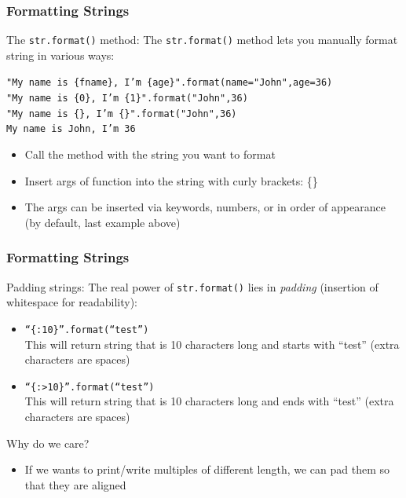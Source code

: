 \documentclass{beamer}
\newcommand{\code}[1]{\texttt{#1}}
\begin{document}
\begin{frame}	
\end{frame}

\begin{frame}	
	\frametitle{Formatting Strings}
	
	\begin{block}{The \code{str.format()} method:}
		The \code{str.format()} method lets you manually format string in various ways:
		
		\vspace{10pt}
		\code{"My name is \{fname\}, I'm \{age\}".format(name="John",age=36)\\
		"My name is \{0\}, I'm \{1\}".format("John",36)\\
		"My name is \{\}, I'm \{\}".format("John",36) \\[10pt]
		My name is John, I'm 36
		}
		
		\vspace{10pt}
		\begin{itemize}
			\item Call the method with the string you want to format
			\item Insert args of function into the string with curly brackets: \{\}
			\item The args can be inserted via keywords, numbers, or in order of appearance (by default, last example above)
		\end{itemize}
	\end{block}
	
\end{frame}

\begin{frame}	
	\frametitle{Formatting Strings}
	
	\begin{block}{Padding strings:}
		The real power of \code{str.format()} lies in \emph{padding} (insertion of whitespace for readability):
		\begin{itemize}
			\item \code{``\{:10\}''.format(``test'')} \\
					This will return string that is 10 characters long and starts with ``test'' (extra characters are spaces)
			\item \code{``\{:$>$10\}''.format(``test'')} \\
					This will return string that is 10 characters long and ends with ``test'' (extra characters are spaces)
		\end{itemize}
		Why do we care?
		\begin{itemize}
			\item If we wants to print/write multiples of different length, we can pad them so that they are aligned
		\end{itemize}
	\end{block}
	
\end{frame}
\end{document}
